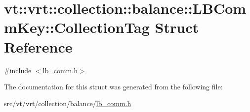 \hypertarget{structvt_1_1vrt_1_1collection_1_1balance_1_1_l_b_comm_key_1_1_collection_tag}{}\section{vt\+:\+:vrt\+:\+:collection\+:\+:balance\+:\+:L\+B\+Comm\+Key\+:\+:Collection\+Tag Struct Reference}
\label{structvt_1_1vrt_1_1collection_1_1balance_1_1_l_b_comm_key_1_1_collection_tag}


{\ttfamily \#include $<$lb\+\_\+comm.\+h$>$}



The documentation for this struct was generated from the following file\+:\begin{DoxyCompactItemize}
\item 
src/vt/vrt/collection/balance/\hyperlink{lb__comm_8h}{lb\+\_\+comm.\+h}\end{DoxyCompactItemize}
